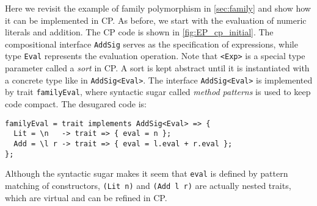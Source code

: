 Here we revisit the example of family polymorphism in \autoref{sec:family} and
show how it can be implemented in CP. As before, we start with the evaluation of
numeric literals and addition. The CP code is shown in
\autoref{fig:EP_cp_initial}. The compositional interface \lstinline{AddSig}
serves as the specification of expressions, while type \lstinline{Eval}
represents the evaluation operation. Note that \lstinline{<Exp>} is a special
type parameter called a \emph{sort} in CP. A sort is kept abstract until it is
instantiated with a concrete type like in \lstinline{AddSig<Eval>}. The
interface \lstinline{AddSig<Eval>} is implemented by trait
\lstinline{familyEval}, where syntactic sugar called \emph{method patterns} is
used to keep code compact. The desugared code is:
\begin{lstlisting}
familyEval = trait implements AddSig<Eval> => {
  Lit = \n   -> trait => { eval = n };
  Add = \l r -> trait => { eval = l.eval + r.eval };
};
\end{lstlisting}
Although the syntactic sugar makes it seem that \lstinline{eval} is defined by
pattern matching of constructors, \lstinline{(Lit n)} and \lstinline{(Add l r)}
are actually nested traits, which are virtual and can be refined in CP.

